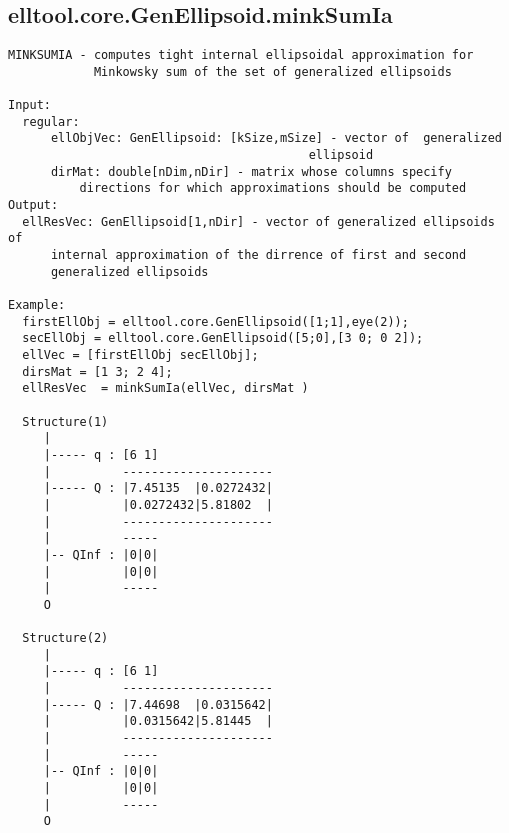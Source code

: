 \subsection{\texorpdfstring{elltool.core.GenEllipsoid.minkSumIa}{minkSumIa}}\label{method:elltool.core.GenEllipsoid.minkSumIa}
\begin{verbatim}
MINKSUMIA - computes tight internal ellipsoidal approximation for
            Minkowsky sum of the set of generalized ellipsoids

Input:
  regular:
      ellObjVec: GenEllipsoid: [kSize,mSize] - vector of  generalized
                                          ellipsoid
      dirMat: double[nDim,nDir] - matrix whose columns specify
          directions for which approximations should be computed
Output:
  ellResVec: GenEllipsoid[1,nDir] - vector of generalized ellipsoids of
      internal approximation of the dirrence of first and second
      generalized ellipsoids

Example:
  firstEllObj = elltool.core.GenEllipsoid([1;1],eye(2));
  secEllObj = elltool.core.GenEllipsoid([5;0],[3 0; 0 2]);
  ellVec = [firstEllObj secEllObj];
  dirsMat = [1 3; 2 4];
  ellResVec  = minkSumIa(ellVec, dirsMat )

  Structure(1)
     |
     |----- q : [6 1]
     |          ---------------------
     |----- Q : |7.45135  |0.0272432|
     |          |0.0272432|5.81802  |
     |          ---------------------
     |          -----
     |-- QInf : |0|0|
     |          |0|0|
     |          -----
     O

  Structure(2)
     |
     |----- q : [6 1]
     |          ---------------------
     |----- Q : |7.44698  |0.0315642|
     |          |0.0315642|5.81445  |
     |          ---------------------
     |          -----
     |-- QInf : |0|0|
     |          |0|0|
     |          -----
     O
\end{verbatim}

